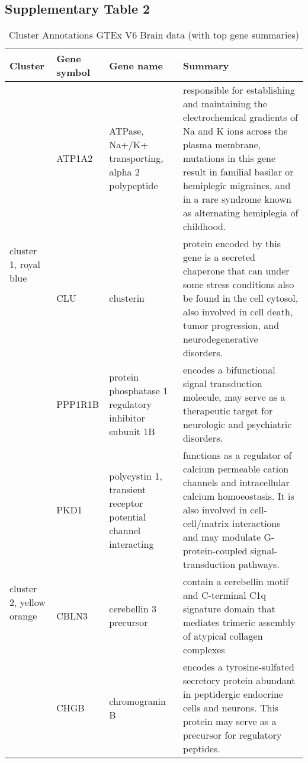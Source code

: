 \subsection{Supplementary Table 2}
\begin{table}[htp]
\begin{center}
\caption{Cluster Annotations GTEx V6 Brain data (with top gene summaries)} \label{tab:supptab2}
\begin{tabular}{|p{0.7in}|p{0.7in}|p{1.4in}|p{3.6in}|} 
\hline
Cluster & Gene symbol & Gene name & Summary \\
\hline
 \multirow{3}{4em}{\small{cluster 1, royal blue}}  &  \small{ATP1A2} & \footnotesize{ ATPase, Na+/K+ transporting, alpha 2 polypeptide} & \scriptsize{responsible for establishing and maintaining the electrochemical gradients of Na and K ions across the plasma membrane, mutations in this gene result in familial basilar or hemiplegic migraines, and in a rare syndrome known as alternating hemiplegia of childhood.}   \\ 
 					      & \small{CLU} &  \footnotesize{clusterin} & \scriptsize{protein encoded by this gene is a secreted chaperone that can under some stress conditions also be found in the cell cytosol, also involved in cell death, tumor progression, and neurodegenerative disorders.} \\
					      & \small{PPP1R1B} & \footnotesize{protein phosphatase 1 regulatory inhibitor subunit 1B} & \scriptsize{encodes a bifunctional signal transduction molecule, may serve as a therapeutic target for neurologic and psychiatric disorders.} \\
\hline
 \multirow{3}{4em}{\small{cluster 2, yellow orange}} & \small{PKD1} & \footnotesize{polycystin 1, transient receptor potential channel interacting} & \scriptsize{functions as a regulator of calcium permeable cation channels and intracellular calcium homoeostasis. It is also involved in cell-cell/matrix interactions and may modulate G-protein-coupled signal-transduction pathways.}\\
 					    & \small{CBLN3} & \footnotesize{cerebellin 3 precursor} & \scriptsize{ contain a cerebellin motif and C-terminal C1q signature domain that mediates trimeric assembly of atypical collagen complexes} \\
					    &  \small{CHGB} &  \footnotesize{chromogranin B} & \scriptsize{ encodes a tyrosine-sulfated secretory protein abundant in peptidergic endocrine cells and neurons. This protein may serve as a precursor for regulatory peptides.} \\

\end{tabular}
\end{center}
\end{table}
